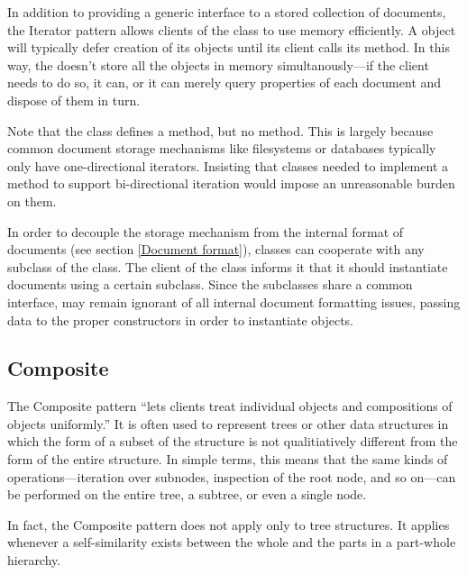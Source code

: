 In addition to providing a generic interface to a stored collection of
documents, the Iterator pattern allows clients of the  class
to use memory efficiently.  A  object will typically defer
creation of its  objects until its client calls its
 method.  In this way, the  doesn't store all
the  objects in memory simultanously---if the client needs to do so,
it can, or it can merely query properties of each document and dispose
of them in turn.

Note that the  class defines a  method,
but no  method.  This is largely because common
document storage mechanisms like filesystems or databases typically
only have one-directional iterators.  Insisting that
 classes needed to implement a 
method to support bi-directional iteration would impose an
unreasonable burden on them.

In order to decouple the storage mechanism from the internal format of
documents (see section \ref{Document format}), 
classes can cooperate with any subclass of the  class.
The client of the  class informs it that it should
instantiate documents using a certain  subclass.
Since the  subclasses share a common interface, 
may remain ignorant of all internal document formatting issues,
passing data to the proper constructors in order to instantiate
 objects.


\subsection{Composite}

The Composite pattern ``lets clients treat individual objects and
compositions of objects uniformly.'' \cite[p. 163]{gamma:95} It is
often used to represent trees or other data structures in which the
form of a subset of the structure is not qualitiatively different from
the form of the entire structure.  In simple terms, this means that
the same kinds of operations---iteration over subnodes, inspection of
the root node, and so on---can be performed on the entire tree, a
subtree, or even a single node.

In fact, the Composite pattern does not apply only to tree
structures.  It applies whenever a self-similarity exists between the
whole and the parts in a part-whole hierarchy.

